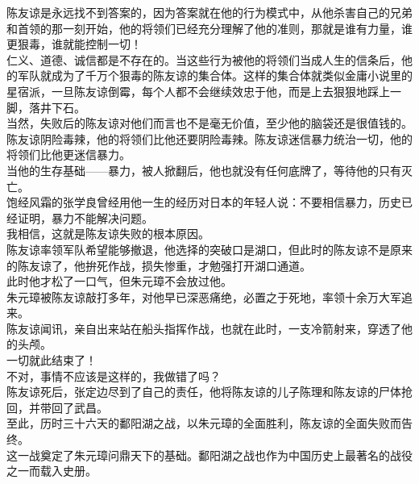 \begin{multicols}{\theparacolNo}
陈友谅是永远找不到答案的，因为答案就在他的行为模式中，从他杀害自己的兄弟和首领的那一刻开始，他的将领们已经充分理解了他的准则，那就是谁有力量，谁更狠毒，谁就能控制一切！\\

仁义、道德、诚信都是不存在的。当这些行为被他的将领们当成人生的信条后，他的军队就成为了千万个狠毒的陈友谅的集合体。这样的集合体就类似金庸小说里的星宿派，一旦陈友谅倒霉，每个人都不会继续效忠于他，而是上去狠狠地踩上一脚，落井下石。\\

当然，失败后的陈友谅对他们而言也不是毫无价值，至少他的脑袋还是很值钱的。\\

陈友谅阴险毒辣，他的将领们比他还要阴险毒辣。陈友谅迷信暴力统治一切，他的将领们比他更迷信暴力。\\

当他的生存基础——暴力，被人掀翻后，他也就没有任何底牌了，等待他的只有灭亡。\\

饱经风霜的张学良曾经用他一生的经历对日本的年轻人说：不要相信暴力，历史已经证明，暴力不能解决问题。\\

我相信，这就是陈友谅失败的根本原因。\\

陈友谅率领军队希望能够撤退，他选择的突破口是湖口，但此时的陈友谅不是原来的陈友谅了，他拚死作战，损失惨重，才勉强打开湖口通道。\\

此时他才松了一口气，但朱元璋不会放过他。\\

朱元璋被陈友谅敲打多年，对他早已深恶痛绝，必置之于死地，率领十余万大军追来。\\

陈友谅闻讯，亲自出来站在船头指挥作战，也就在此时，一支冷箭射来，穿透了他的头颅。\\

一切就此结束了！\\

不对，事情不应该是这样的，我做错了吗？\\

陈友谅死后，张定边尽到了自己的责任，他将陈友谅的儿子陈理和陈友谅的尸体抢回，并带回了武昌。\\

至此，历时三十六天的鄱阳湖之战，以朱元璋的全面胜利，陈友谅的全面失败而告终。\\

这一战奠定了朱元璋问鼎天下的基础。鄱阳湖之战也作为中国历史上最著名的战役之一而载入史册。\\


\end{multicols}
